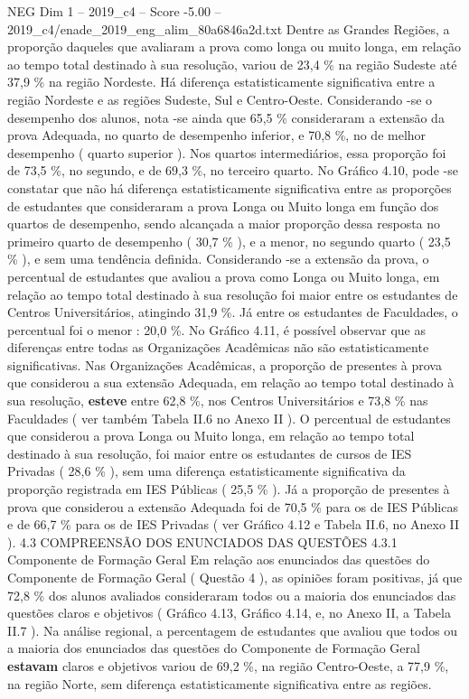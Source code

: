 \begin{textsample}{NEG Dim 1 – 2019\_c4 – Score -5.00 – 2019\_c4/enade\_2019\_eng\_alim\_80a6846a2d.txt}
Dentre as Grandes Regiões, a proporção daqueles que avaliaram a prova como longa ou muito longa, em relação ao tempo total destinado à sua resolução, variou de 23,4 \% na região Sudeste até 37,9 \% na região Nordeste.
Há diferença estatisticamente significativa entre a região Nordeste e as regiões Sudeste, Sul e Centro-Oeste.
Considerando -se o desempenho dos alunos, nota -se ainda que 65,5 \% consideraram a extensão da prova Adequada, no quarto de desempenho inferior, e 70,8 \%, no de melhor desempenho ( quarto superior ).
Nos quartos intermediários, essa proporção foi de 73,5 \%, no segundo, e de 69,3 \%, no terceiro quarto.
No Gráfico 4.10, pode -se constatar que não há diferença estatisticamente significativa entre as proporções de estudantes que consideraram a prova Longa ou Muito longa em função dos quartos de desempenho, sendo alcançada a maior proporção dessa resposta no primeiro quarto de desempenho ( 30,7 \% ), e a menor, no segundo quarto ( 23,5 \% ), e sem uma tendência definida.
Considerando -se a extensão da prova, o percentual de estudantes que avaliou a prova como Longa ou Muito longa, em relação ao tempo total destinado à sua resolução foi maior entre os estudantes de Centros Universitários, atingindo 31,9 \%.
Já entre os estudantes de Faculdades, o percentual foi o menor : 20,0 \%.
No Gráfico 4.11, é possível observar que as diferenças entre todas as Organizações Acadêmicas não são estatisticamente significativas.
Nas Organizações Acadêmicas, a proporção de presentes à prova que considerou a sua extensão Adequada, em relação ao tempo total destinado à sua resolução, \textbf{esteve} entre 62,8 \%, nos Centros Universitários e 73,8 \% nas Faculdades ( ver também Tabela II.6 no Anexo II ).
O percentual de estudantes que considerou a prova Longa ou Muito longa, em relação ao tempo total destinado à sua resolução, foi maior entre os estudantes de cursos de IES Privadas ( 28,6 \% ), sem uma diferença estatisticamente significativa da proporção registrada em IES Públicas ( 25,5 \% ).
Já a proporção de presentes à prova que considerou a extensão Adequada foi de 70,5 \% para os de IES Públicas e de 66,7 \% para os de IES Privadas ( ver Gráfico 4.12 e Tabela II.6, no Anexo II ). 4.3 COMPREENSÃO DOS ENUNCIADOS DAS QUESTÕES 4.3.1 Componente de Formação Geral Em relação aos enunciados das questões do Componente de Formação Geral ( Questão 4 ), as opiniões foram positivas, já que 72,8 \% dos alunos avaliados consideraram todos ou a maioria dos enunciados das questões claros e objetivos ( Gráfico 4.13, Gráfico 4.14, e, no Anexo II, a Tabela II.7 ).
Na análise regional, a percentagem de estudantes que avaliou que todos ou a maioria dos enunciados das questões do Componente de Formação Geral \textbf{estavam} claros e objetivos variou de 69,2 \%, na região Centro-Oeste, a 77,9 \%, na região Norte, sem diferença estatisticamente significativa entre as regiões.

\end{textsample}
